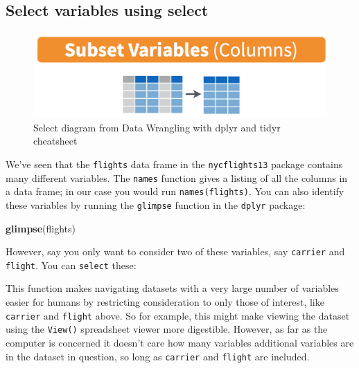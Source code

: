 \documentclass[12pt,]{krantz}
\makeatletter
\newenvironment{Shaded}{\begin{snugshade}}{\end{snugshade}}
\newcommand{\KeywordTok}[1]{\textcolor[rgb]{0.27,0.27,0.27}{\textbf{#1}}}
\newcommand{\StringTok}[1]{\textcolor[rgb]{0.5,0.5,0.5}{#1}}
\newcommand{\OperatorTok}[1]{\textcolor[rgb]{0.43,0.43,0.43}{\textbf{#1}}}
\newcommand{\NormalTok}[1]{#1}
\newenvironment{kframe}{%
\medskip{}
\setlength{\fboxsep}{.8em}
 \def\at@end@of@kframe{}%
 \ifinner\ifhmode%
  \def\at@end@of@kframe{\end{minipage}}%
  \begin{minipage}{\columnwidth}%
 \fi\fi%
 \def\FrameCommand##1{\hskip\@totalleftmargin \hskip-\fboxsep
 \colorbox{shadecolor}{##1}\hskip-\fboxsep
     \hskip-\linewidth \hskip-\@totalleftmargin \hskip\columnwidth}%
 \MakeFramed {\advance\hsize-\width
   \@totalleftmargin\z@ \linewidth\hsize
   \@setminipage}}%
 {\par\unskip\endMakeFramed%
 \at@end@of@kframe}
\renewenvironment{Shaded}{\begin{kframe}}{\end{kframe}}
\makeatother
\begin{document}
\subsection{Select variables using select}\label{select}

\begin{figure}

{\centering \includegraphics[width=\textwidth]{images/select} 

}

\caption{Select diagram from Data Wrangling with dplyr and tidyr cheatsheet}\label{fig:selectfig}
\end{figure}

We've seen that the \texttt{flights} data frame in the
\texttt{nycflights13} package contains many different variables. The
\texttt{names} function gives a listing of all the columns in a data
frame; in our case you would run \texttt{names(flights)}. You can also
identify these variables by running the \texttt{glimpse} function in the
\texttt{dplyr} package:

\begin{Shaded}
\begin{Highlighting}[]
\KeywordTok{glimpse}\NormalTok{(flights)}
\end{Highlighting}
\end{Shaded}

However, say you only want to consider two of these variables, say
\texttt{carrier} and \texttt{flight}. You can \texttt{select} these:

\begin{Shaded}
\end{Shaded}

This function makes navigating datasets with a very large number of
variables easier for humans by restricting consideration to only those
of interest, like \texttt{carrier} and \texttt{flight} above. So for
example, this might make viewing the dataset using the \texttt{View()}
spreadsheet viewer more digestible. However, as far as the computer is
concerned it doesn't care how many variables additional variables are in
the dataset in question, so long as \texttt{carrier} and \texttt{flight}
are included.
\end{document}
